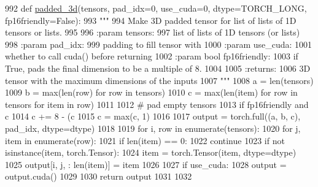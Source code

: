 \begin{DoxyCode}
992 \textcolor{keyword}{def }\hyperlink{namespaceparlai_1_1utils_1_1misc_ad96b0c9ef6237d9ca051251089faf2c7}{padded\_3d}(tensors, pad\_idx=0, use\_cuda=0, dtype=TORCH\_LONG, fp16friendly=False):
993     \textcolor{stringliteral}{"""}
994 \textcolor{stringliteral}{    Make 3D padded tensor for list of lists of 1D tensors or lists.}
995 \textcolor{stringliteral}{}
996 \textcolor{stringliteral}{    :param tensors:}
997 \textcolor{stringliteral}{        list of lists of 1D tensors (or lists)}
998 \textcolor{stringliteral}{    :param pad\_idx:}
999 \textcolor{stringliteral}{        padding to fill tensor with}
1000 \textcolor{stringliteral}{    :param use\_cuda:}
1001 \textcolor{stringliteral}{        whether to call cuda() before returning}
1002 \textcolor{stringliteral}{    :param bool fp16friendly:}
1003 \textcolor{stringliteral}{        if True, pads the final dimension to be a multiple of 8.}
1004 \textcolor{stringliteral}{}
1005 \textcolor{stringliteral}{    :returns:}
1006 \textcolor{stringliteral}{        3D tensor with the maximum dimensions of the inputs}
1007 \textcolor{stringliteral}{    """}
1008     a = len(tensors)
1009     b = max(len(row) \textcolor{keywordflow}{for} row \textcolor{keywordflow}{in} tensors)
1010     c = max(len(item) \textcolor{keywordflow}{for} row \textcolor{keywordflow}{in} tensors \textcolor{keywordflow}{for} item \textcolor{keywordflow}{in} row)
1011 
1012     \textcolor{comment}{# pad empty tensors}
1013     \textcolor{keywordflow}{if} fp16friendly \textcolor{keywordflow}{and} c %
1014         c += 8 - (c %
1015     c = max(c, 1)
1016 
1017     output = torch.full((a, b, c), pad\_idx, dtype=dtype)
1018 
1019     \textcolor{keywordflow}{for} i, row \textcolor{keywordflow}{in} enumerate(tensors):
1020         \textcolor{keywordflow}{for} j, item \textcolor{keywordflow}{in} enumerate(row):
1021             \textcolor{keywordflow}{if} len(item) == 0:
1022                 \textcolor{keywordflow}{continue}
1023             \textcolor{keywordflow}{if} \textcolor{keywordflow}{not} isinstance(item, torch.Tensor):
1024                 item = torch.Tensor(item, dtype=dtype)
1025             output[i, j, : len(item)] = item
1026 
1027     \textcolor{keywordflow}{if} use\_cuda:
1028         output = output.cuda()
1029 
1030     \textcolor{keywordflow}{return} output
1031 
1032 
\end{DoxyCode}
\mbox{\label{namespaceparlai_1_1utils_1_1misc_ad3f3c350e8b394482f73a240e19ec3ac}} 

